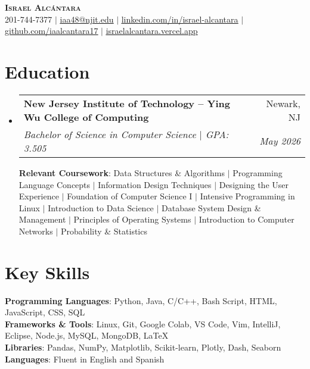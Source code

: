 \documentclass[letterpaper,11pt]{article}
\makeatletter
\newcommand{\resumeSubheading}[4]{
  \vspace{-2pt}\item
    \begin{tabular*}{0.97\textwidth}[t]{l@{\extracolsep{\fill}}r}
      \textbf{#1} & #2 \\
      \textit{\small#3} & \textit{\small #4} \\
    \end{tabular*}\vspace{-7pt}
}
\newcommand{\resumeSubHeadingListStart}{\begin{itemize}[leftmargin=0.15in, label={}]}
\newcommand{\resumeSubHeadingListEnd}{\end{itemize}}
\makeatother
\begin{document}
\begin{center}
    \textbf{\Huge \scshape Israel Alcántara} \\ \vspace{1pt}
    \small 201-744-7377 $|$ 
    \href{mailto:iaa48@njit.edu}{\underline{iaa48@njit.edu}} $|$ 
    \href{https://linkedin.com/in/israel-alcantara}{\underline{linkedin.com/in/israel-alcantara}} $|$
    \href{https://github.com/iaalcantara17}{\underline{github.com/iaalcantara17}} $|$
    \href{https://israelalcantara.vercel.app/}{\underline{israelalcantara.vercel.app}}
\end{center}

\section{Education}
  \resumeSubHeadingListStart
    \resumeSubheading
      {New Jersey Institute of Technology – Ying Wu College of Computing}{Newark, NJ}
      {Bachelor of Science in Computer Science $|$ GPA: 3.505}{May 2026}
      \begin{flushleft}
        \small \textbf{Relevant Coursework}: Data Structures \& Algorithms $|$ Programming Language Concepts $|$ Information Design Techniques $|$ Designing the User Experience $|$ Foundation of Computer Science I $|$ Intensive Programming in Linux $|$ Introduction to Data Science $|$ Database System Design \& Management $|$ Principles of Operating Systems $|$ Introduction to Computer Networks $|$ Probability \& Statistics
      \end{flushleft}
  \resumeSubHeadingListEnd

\section{Key Skills}
\begin{itemize}[leftmargin=0.15in, label={}]
    \small{\item{
      \textbf{Programming Languages}{: Python, Java, C/C++, Bash Script, HTML, JavaScript, CSS, SQL} \\
      \textbf{Frameworks \& Tools}{: Linux, Git, Google Colab, VS Code, Vim, IntelliJ, Eclipse, Node.js, MySQL, MongoDB, LaTeX} \\
      \textbf{Libraries}{: Pandas, NumPy, Matplotlib, Scikit-learn, Plotly, Dash, Seaborn} \\
      \textbf{Languages}{: Fluent in English and Spanish} \\
    }}
\end{itemize}
\end{document}
